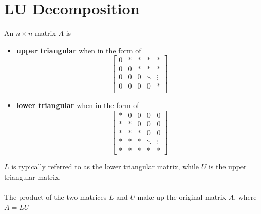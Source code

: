 \section{LU Decomposition}
An $n \times n$ matrix $A$ is
\begin{itemize}
  \item \textbf{upper triangular} when in the form of
    \[
      \begin{bmatrix}
        0 & * & * & * & * \\
        0 & 0 & * & * & * \\
        0 & 0 & 0 & \ddots & \vdots \\
        0 & 0 & 0 & 0 & * \\
      \end{bmatrix}
    \]  
  \item \textbf{lower triangular} when in the form of
    \[
      \begin{bmatrix}
        * & 0 & 0 & 0 & 0 \\
        * & * & 0 & 0 & 0 \\
        * & * & * & 0 & 0 \\
        * & * & * & \ddots & \vdots \\
        * & * & * & * & *
      \end{bmatrix}
    \]
\end{itemize}
$L$ is typically referred to as the lower triangular matrix, while $U$ is the upper triangular
matrix. \\\\
The product of the two matrices $L$ and $U$ make up the original matrix $A$, where $A = LU$ 
